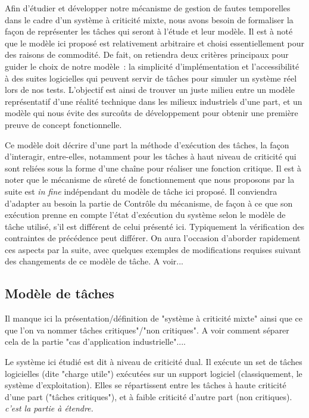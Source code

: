\documentclass[french, a4paper, 11pt, twoside, pdftex]{StyleThese}
\begin{document}
    Afin d'étudier et développer notre mécanisme de gestion de fautes temporelles dans le cadre d'un système à criticité mixte, nous avons besoin de formaliser la façon de représenter les tâches qui seront à l'étude et leur modèle. Il est à noté que le modèle ici proposé est relativement arbitraire et choisi essentiellement pour des raisons de commodité. De fait, on retiendra deux critères principaux pour guider le choix de notre modèle~: la simplicité d'implémentation et l'accessibilité à des suites logicielles qui peuvent servir de tâches pour simuler un système réel lors de nos tests. L'objectif est ainsi de trouver un juste milieu entre un modèle représentatif d'une réalité technique dans les milieux industriels d'une part, et un modèle qui nous évite des surcoûts de développement pour obtenir une première preuve de concept fonctionnelle.
    
    
    Ce modèle doit décrire d'une part la méthode d'exécution des tâches, la façon d'interagir, entre-elles, notamment pour les tâches à haut niveau de criticité qui sont reliées sous la forme d'une chaîne pour réaliser une fonction critique. Il est à noter que le mécanisme de sûreté de fonctionnement que nous proposons par la suite est \textit{in fine} indépendant du modèle de tâche ici proposé. Il conviendra d'adapter au besoin la partie de Contrôle du mécanisme, de façon à ce que son exécution prenne en compte l'état d'exécution du système selon le modèle de tâche utilisé, s'il est différent de celui présenté ici. Typiquement la vérification des contraintes de précédence peut différer. On aura l'occasion d'aborder rapidement ces aspects par la suite, avec quelques exemples de modifications requises suivant des changements de ce modèle de tâche. \alert{A voir...}
    
    \subsection{Modèle de tâches}
        \alert{Il manque ici la présentation/définition de "système à criticité mixte" ainsi que ce que l'on va nommer tâches critiques"/"non critiques".  A voir comment séparer cela de la partie "cas d'application industrielle".... }

    Le système ici étudié est dit à niveau de criticité dual. Il exécute un set de tâches logicielles (dite "charge utile") exécutées sur un support logiciel (classiquement, le système d'exploitation). Elles se répartissent entre les tâches à haute criticité d'une part ("tâches critiques"), et à faible criticité d'autre part (non critiques). \textit{c'est la partie à étendre.}
    
\end{document}
